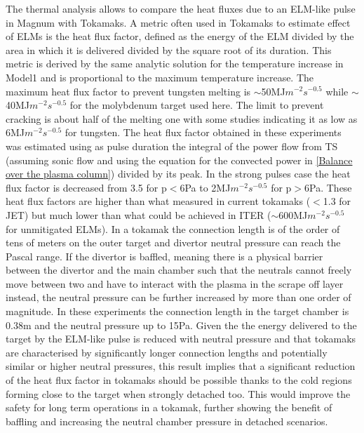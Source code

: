 The thermal analysis allows to compare the heat fluxes due to an ELM-like pulse in Magnum with Tokamaks. A metric often used in Tokamaks to estimate effect of ELMs is the heat flux factor, defined as the energy of the ELM divided by the area in which it is delivered divided by the square root of its duration. This metric is derived by the same analytic solution for the temperature increase in Model1 and is proportional to the maximum temperature increase. The maximum heat flux factor to prevent tungsten melting is $\sim$50MJ$m^{-2} s^{-0.5}$ while $\sim$40MJ$m^{-2} s^{-0.5}$ for the molybdenum target used here. The limit to prevent cracking is about half of the melting one\cite{Pintsuk2007} with some studies indicating it as low as 6MJ$m^{-2} s^{-0.5}$ for tungsten.\cite{Linke2019}
The heat flux factor obtained in these experiments was estimated using as pulse duration the integral of the power flow from TS (assuming sonic flow and using the equation for the convected power in \autoref{Balance over the plasma column}) divided by its peak. In the strong pulses case the heat flux factor is decreased from 3.5 for p$<$6Pa to 2MJ$m^{-2} s^{-0.5}$ for p$>$6Pa. These heat flux factors are higher than what measured in current tokamaks ($<$1.3 for JET) but much lower than what could be achieved in ITER ($\sim$600MJ$m^{-2} s^{-0.5}$ for unmitigated ELMs).\cite{Jachmich2011} In a tokamak the connection length is of the order of tens of meters on the outer target and divertor neutral pressure can reach the Pascal range\cite{Kallenbach2018}. If the divertor is baffled, meaning there is a physical barrier between the divertor and the main chamber such that the neutrals cannot freely move between two and have to interact with the plasma in the scrape off layer instead, the neutral pressure can be further increased by more than one order of magnitude.\cite{Galassi2020,Pitcher2000} In these experiments the connection length in the target chamber is 0.38m and the neutral pressure up to 15Pa. Given the the energy delivered to the target by the ELM-like pulse is reduced with neutral pressure and that tokamaks are characterised by significantly longer connection lengths and potentially similar or higher neutral pressures, this result implies that a significant reduction of the heat flux factor in tokamaks should be possible thanks to the cold regions forming close to the target when strongly detached too. This would improve the safety for long term operations in a tokamak, further showing the benefit of baffling and increasing the neutral chamber pressure in detached scenarios.

